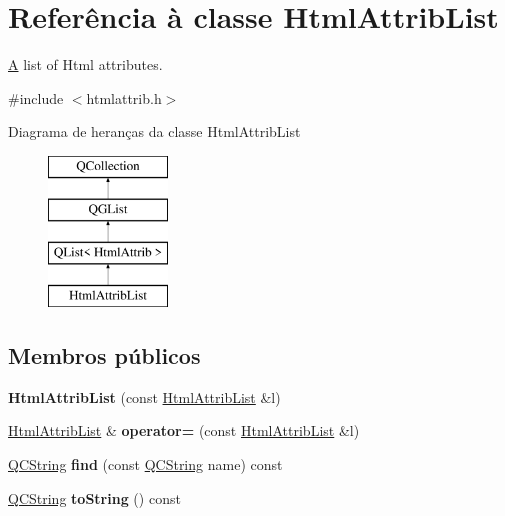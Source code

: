 \hypertarget{class_html_attrib_list}{\section{Referência à classe Html\-Attrib\-List}
\label{class_html_attrib_list}
}


\hyperlink{class_a}{A} list of Html attributes.  




{\ttfamily \#include $<$htmlattrib.\-h$>$}

Diagrama de heranças da classe Html\-Attrib\-List\begin{figure}[H]
\begin{center}
\leavevmode
\includegraphics[height=4.000000cm]{class_html_attrib_list}
\end{center}
\end{figure}
\subsection*{Membros públicos}
\begin{DoxyCompactItemize}
\item 
\hypertarget{class_html_attrib_list_a321802ff7449ec16ec340cd0c8836e30}{{\bfseries Html\-Attrib\-List} (const \hyperlink{class_html_attrib_list}{Html\-Attrib\-List} \&l)}\label{class_html_attrib_list_a321802ff7449ec16ec340cd0c8836e30}

\item 
\hypertarget{class_html_attrib_list_aeddda686df4c1839dc5172614ce93875}{\hyperlink{class_html_attrib_list}{Html\-Attrib\-List} \& {\bfseries operator=} (const \hyperlink{class_html_attrib_list}{Html\-Attrib\-List} \&l)}\label{class_html_attrib_list_aeddda686df4c1839dc5172614ce93875}

\item 
\hypertarget{class_html_attrib_list_ad4ce9954a89740d8e6ca376329b113c8}{\hyperlink{class_q_c_string}{Q\-C\-String} {\bfseries find} (const \hyperlink{class_q_c_string}{Q\-C\-String} name) const }\label{class_html_attrib_list_ad4ce9954a89740d8e6ca376329b113c8}

\item 
\hypertarget{class_html_attrib_list_accfeb508e965628127257559e6f9955d}{\hyperlink{class_q_c_string}{Q\-C\-String} {\bfseries to\-String} () const }\label{class_html_attrib_list_accfeb508e965628127257559e6f9955d}

\end{DoxyCompactItemize}
